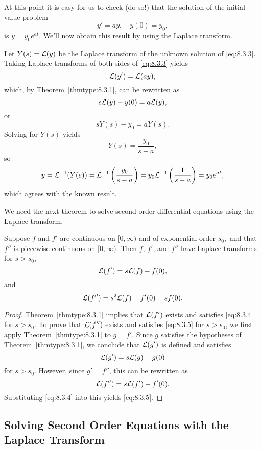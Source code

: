\documentclass{ximera}
\begin{document}
At this point it is easy for us to check (do so!)
that the solution of the
initial value problem
\begin{equation}\label{eq:8.3.3}
y'=ay, \quad  y(0)=y_0,
\end{equation}
 is $y=y_0e^{at}$.
We'll now obtain this result by using the Laplace transform.

Let $Y(s)={\cal L}(y)$ be the Laplace transform of the unknown solution
of \eqref{eq:8.3.3}. Taking Laplace transforms of both sides of
\eqref{eq:8.3.3} yields
$$
{\cal L}(y')={\cal L}(ay),
$$
which, by Theorem~\ref{thmtype:8.3.1}, can be rewritten as
$$
s{\cal L}(y)-y(0)=a{\cal L}(y),
$$
or
$$
sY(s)-y_0=aY(s).
$$
Solving for $Y(s)$ yields
$$
Y(s)=\frac{y_0}{s-a},
$$
so
$$
y={\cal L}^{-1}(Y(s))={\cal L}^{-1}\left(\frac{y_0}{s-a}\right)=y_0{\cal
L}^{-1}\left(\frac{1}{s-a}\right)=y_0e^{at},
$$
which agrees with the known result.

We  need the next theorem to solve second order differential equations
using  the Laplace transform.

\begin{theorem}\label{thmtype:8.3.2}
Suppose $f$ and $f'$ are continuous on $[0,\infty)$ and of
exponential order $s_0,$ and that $f''$ is piecewise continuous on
$[0,\infty).$ Then $f$, $f'$, and $f''$ have Laplace transforms for $s
> s_0$,
\begin{equation}\label{eq:8.3.4}
{\cal L}(f')=s {\cal L}(f)-f(0),
\end{equation}
and
\begin{equation}\label{eq:8.3.5}
{\cal L}(f'')=s^2{\cal L}(f)-f'(0)-sf(0).
\end{equation}
\end{theorem}

\begin{proof}
Theorem~\ref{thmtype:8.3.1} implies that ${\cal L}(f')$ exists and
satisfies \eqref{eq:8.3.4} for $s>s_0$. To prove that ${\cal L}(f'')$
exists and satisfies \eqref{eq:8.3.5} for $s>s_0$, we first apply
Theorem~\ref{thmtype:8.3.1} to $g=f'$. Since $g$ satisfies the hypotheses
of Theorem~\ref{thmtype:8.3.1}, we conclude that ${\cal L}(g')$ is defined
and satisfies
$$
{\cal L}(g')=s{\cal L}(g)-g(0)
$$
for $s>s_0$. However, since $g'=f''$, this can be rewritten as
$$
{\cal L}(f'')=s{\cal L}(f')-f'(0).
$$
Substituting \eqref{eq:8.3.4} into this yields
\eqref{eq:8.3.5}.
\end{proof}

\subsection*{Solving Second Order Equations with the Laplace Transform}
\end{document}
